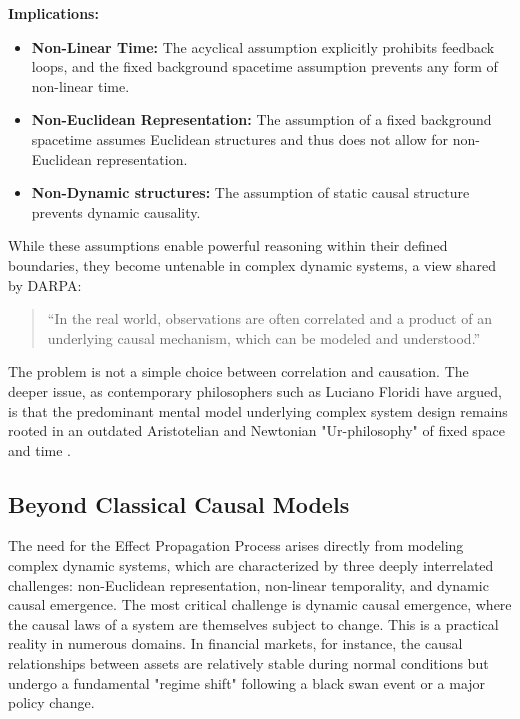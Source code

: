 {\textbf{Implications:}

\begin{itemize}
    \item \textbf{Non-Linear Time:} The acyclical assumption explicitly prohibits feedback loops, and the fixed background spacetime assumption prevents any form of non-linear time.
    \item \textbf{Non-Euclidean Representation:} The assumption of a fixed background spacetime assumes Euclidean structures and thus does not allow for non-Euclidean representation.
    \item \textbf{Non-Dynamic structures:} The assumption of static causal structure prevents  dynamic causality. 
\end{itemize}

While these assumptions enable powerful reasoning within their defined boundaries, they become untenable in complex dynamic systems, a view shared by DARPA:

\begin{quote}
    “In the real world, observations are often correlated and a product of an underlying causal mechanism, which can be modeled and understood.”\cite{DARPA_ANSR}
\end{quote}

The problem is not a simple choice between correlation and causation. The deeper issue, as contemporary philosophers such as  Luciano Floridi have argued, is that the predominant mental model underlying complex system design remains rooted in an outdated Aristotelian and Newtonian "Ur-philosophy" of fixed space and time \cite{floridi2025applied}.

\subsection{Beyond Classical Causal Models}

The need for the Effect Propagation Process arises directly from modeling complex dynamic systems, which are characterized by three deeply interrelated challenges: non-Euclidean representation, non-linear temporality, and dynamic causal emergence. The most critical challenge is dynamic causal emergence, where the causal laws of a system are themselves subject to change. This is  a practical reality in numerous domains. In financial markets, for instance, the causal relationships between assets are relatively stable during normal conditions but undergo a fundamental "regime shift" following a black swan event or a major policy change. 

}
